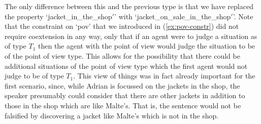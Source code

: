 The only difference between this and the previous type is that we have
replaced the property `jacket\_in\_the\_shop$'$' with
`jacket\_on\_sale\_in\_the\_shop$'$'.  Note that the constraint on
`pov' that we introduced in (\ref{ex:pov-constr}) did not require
coextension in any way, only that if  an agent were to judge a
situation as of type $T_1$ then the agent with the point of view would
judge the situation to be of the point of view type.  This allows for
the possibility that there could be additional situations of the point
of view type which the first agent would not judge to be of type
$T_1$.  This view of things was in fact already important for the
first scenario, since, while Adrian is focussed on the jackets in the
shop, the speaker presumably could consider that there are other
jackets in addition to those in the shop which are like Malte's.  That
is, the sentence would not be falsified by discovering a jacket like
Malte's which is not in the shop. 

